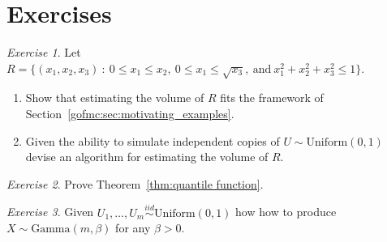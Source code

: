 \documentclass[12pt]{article}
\theoremstyle{plain}
\theoremstyle{definition}
\theoremstyle{remark}
\newtheorem{hw}{Exercise}[section]
\begin{document}
\begin{comment}
\subsubsection{Multivariate Stopping Rules}
\label{gofmc:sec:mstop}
The obvious extension of the univariate approach to controlling the width
of a confidence interval is to control the volume of the confidence
ellipsoid which, letting $\det$ denote determinant, is given by
$$
\frac{2 \pi^{p/2} k^p}{p \Gamma(p)} \det(S)^{1/2}\; .
$$
We call $\det{S}$ the \textit{generalized variance} of the Monte Carlo
error. While $\det(S)$ is a useful univariate summary it can give an incomplete
picture of the nature of Monte Carlo error.   Recall that
$\det(S)=\lambda_1  \cdots \lambda_p$ so a small generalized variance
can be achieved with one tiny eigenvalue. Thus examination of the
sample eigenvalues is advised in applications.

Other useful approaches include standardization to adjust for the
marginal variation in the simulation and for the number of quantities
being estimated.  These options are explored in the exercises.
\end{comment}



\section*{Exercises}
\begin{hw}
Let $R = \{(x_1, x_2, x_3) ~:~ 0\le x_1\le x_2, ~0 \le x_1 \le
  \sqrt{x_3},~ \text{and}~ x_1^2 + x_2^2 + x_3^2 \le 1 \}$.
\begin{enumerate}
\item Show that estimating the volume of $R$ fits the framework of
  Section~\ref{gofmc:sec:motivating_examples}.
\item Given the ability to simulate independent copies of $U \sim
  \text{Uniform}(0,1)$ devise an algorithm for estimating the volume
  of $R$.
\end{enumerate}
\end{hw}

\begin{hw}
  Prove Theorem~\ref{thm:quantile function}.
\end{hw}

\begin{hw} 
Given $U_1, \ldots , U_m \stackrel{iid}{\sim}
  \text{Uniform}(0,1)$ how how to produce $X \sim \text{Gamma}(m,
  \beta)$ for any $\beta > 0$.
\end{hw}
\end{document}

